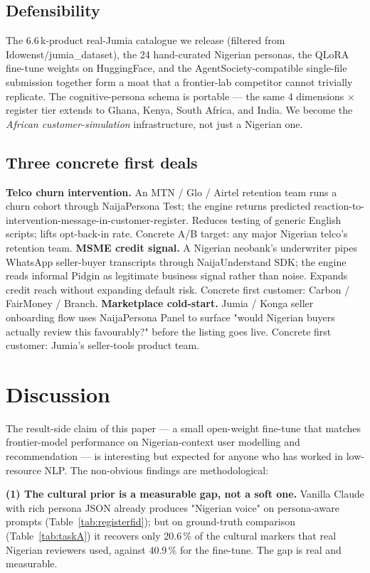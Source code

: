\documentclass[sigconf,nonacm,balance]{acmart}
\begin{document}
\subsection*{Defensibility}
The 6.6\,k-product real-Jumia catalogue we release (filtered from
\textsf{Idowenst/jumia\_dataset}), the 24 hand-curated Nigerian personas,
the QLoRA fine-tune weights on HuggingFace, and the AgentSociety-compatible
single-file submission together form a moat that a frontier-lab competitor
cannot trivially replicate. The cognitive-persona schema is portable ---
the same 4 dimensions $\times$ register tier extends to Ghana, Kenya,
South Africa, and India. We become the \emph{African customer-simulation}
infrastructure, not just a Nigerian one.

\subsection*{Three concrete first deals}
\textbf{Telco churn intervention.} An MTN / Glo / Airtel retention team
runs a churn cohort through NaijaPersona Test; the engine returns
predicted reaction-to-intervention-message-in-customer-register. Reduces
testing of generic English scripts; lifts opt-back-in rate. Concrete A/B
target: any major Nigerian telco's retention team.
\textbf{MSME credit signal.} A Nigerian neobank's underwriter pipes
WhatsApp seller-buyer transcripts through NaijaUnderstand SDK; the engine
reads informal Pidgin as legitimate business signal rather than noise.
Expands credit reach without expanding default risk. Concrete first
customer: Carbon / FairMoney / Branch.
\textbf{Marketplace cold-start.} Jumia / Konga seller onboarding flow
uses NaijaPersona Panel to surface "would Nigerian buyers actually
review this favourably?" before the listing goes live. Concrete first
customer: Jumia's seller-tools product team.

\section{Discussion}
\label{sec:discussion}

The result-side claim of this paper --- a small open-weight fine-tune
that matches frontier-model performance on Nigerian-context user
modelling and recommendation --- is interesting but expected for anyone
who has worked in low-resource NLP. The non-obvious findings are
methodological:

\textbf{(1) The cultural prior is a measurable gap, not a soft one.}
Vanilla Claude with rich persona JSON already produces "Nigerian voice"
on persona-aware prompts (Table~\ref{tab:registerfid}); but on
ground-truth comparison (Table~\ref{tab:taskA}) it recovers only 20.6\,\%
of the cultural markers that real Nigerian reviewers used, against
40.9\,\% for the fine-tune. The gap is real and measurable.
\end{document}
